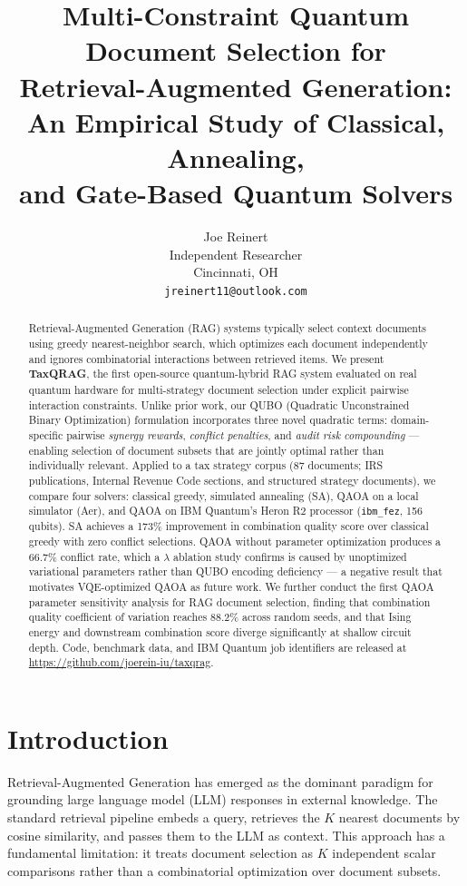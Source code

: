 \documentclass{article}
\title{Multi-Constraint Quantum Document Selection for\\
Retrieval-Augmented Generation:\\
An Empirical Study of Classical, Annealing,\\
and Gate-Based Quantum Solvers}
\author{
  Joe Reinert \\
  Independent Researcher \\
  Cincinnati, OH \\
  \texttt{jreinert11@outlook.com} \\
}
\begin{document}
\maketitle

\begin{abstract}
Retrieval-Augmented Generation (RAG) systems typically select context
documents using greedy nearest-neighbor search, which optimizes each
document independently and ignores combinatorial interactions between
retrieved items. We present \textbf{TaxQRAG}, the first open-source
quantum-hybrid RAG system evaluated on real quantum hardware for
multi-strategy document selection under explicit pairwise interaction
constraints. Unlike prior work, our QUBO (Quadratic Unconstrained
Binary Optimization) formulation incorporates three novel quadratic
terms: domain-specific pairwise \emph{synergy rewards}, \emph{conflict
penalties}, and \emph{audit risk compounding} — enabling selection of
document subsets that are jointly optimal rather than individually
relevant. Applied to a tax strategy corpus (87 documents; IRS
publications, Internal Revenue Code sections, and structured strategy
documents), we compare four solvers: classical greedy, simulated
annealing (SA), QAOA on a local simulator (Aer), and QAOA on IBM
Quantum's Heron R2 processor (\texttt{ibm\_fez}, 156 qubits). SA
achieves a 173\% improvement in combination quality score over classical
greedy with zero conflict selections. QAOA without parameter
optimization produces a 66.7\% conflict rate, which a $\lambda$
ablation study confirms is caused by unoptimized variational parameters
rather than QUBO encoding deficiency — a negative result that
motivates VQE-optimized QAOA as future work. We further conduct the
first QAOA parameter sensitivity analysis for RAG document selection,
finding that combination quality coefficient of variation reaches 88.2\%
across random seeds, and that Ising energy and downstream combination
score diverge significantly at shallow circuit depth. Code, benchmark
data, and IBM Quantum job identifiers are released at
\url{https://github.com/joerein-iu/taxqrag}.
\end{abstract}

\section{Introduction}

Retrieval-Augmented Generation \cite{lewis2020rag} has emerged as the
dominant paradigm for grounding large language model (LLM) responses in
external knowledge. The standard retrieval pipeline embeds a query,
retrieves the $K$ nearest documents by cosine similarity, and passes
them to the LLM as context. This approach has a fundamental limitation:
it treats document selection as $K$ independent scalar comparisons
rather than a combinatorial optimization over document subsets.
\end{document}
